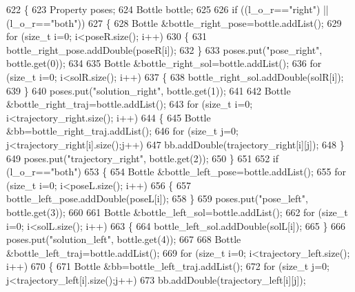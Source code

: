\begin{DoxyCode}
622 \{
623     Property poses;
624     Bottle bottle;
625 
626     \textcolor{keywordflow}{if} ((l\_o\_r==\textcolor{stringliteral}{"right"}) || (l\_o\_r==\textcolor{stringliteral}{"both"}))
627     \{
628         Bottle &bottle\_right\_pose=bottle.addList();
629         \textcolor{keywordflow}{for} (\textcolor{keywordtype}{size\_t} i=0; i<poseR.size(); i++)
630         \{
631             bottle\_right\_pose.addDouble(poseR[i]);
632         \}
633         poses.put(\textcolor{stringliteral}{"pose\_right"}, bottle.get(0));
634 
635         Bottle &bottle\_right\_sol=bottle.addList();
636         \textcolor{keywordflow}{for} (\textcolor{keywordtype}{size\_t} i=0; i<solR.size(); i++)
637         \{
638             bottle\_right\_sol.addDouble(solR[i]);
639         \}
640         poses.put(\textcolor{stringliteral}{"solution\_right"}, bottle.get(1));
641 
642         Bottle &bottle\_right\_traj=bottle.addList();
643         \textcolor{keywordflow}{for} (\textcolor{keywordtype}{size\_t} i=0; i<trajectory_right.size(); i++)
644         \{
645             Bottle &bb=bottle\_right\_traj.addList();
646             \textcolor{keywordflow}{for} (\textcolor{keywordtype}{size\_t} j=0; j<trajectory_right[i].size();j++)
647                 bb.addDouble(trajectory_right[i][j]);
648         \}
649         poses.put(\textcolor{stringliteral}{"trajectory\_right"}, bottle.get(2));
650     \}
651 
652     \textcolor{keywordflow}{if} (l\_o\_r==\textcolor{stringliteral}{"both"})
653     \{
654         Bottle &bottle\_left\_pose=bottle.addList();
655         \textcolor{keywordflow}{for} (\textcolor{keywordtype}{size\_t} i=0; i<poseL.size(); i++)
656         \{
657             bottle\_left\_pose.addDouble(poseL[i]);
658         \}
659         poses.put(\textcolor{stringliteral}{"pose\_left"}, bottle.get(3));
660 
661         Bottle &bottle\_left\_sol=bottle.addList();
662         \textcolor{keywordflow}{for} (\textcolor{keywordtype}{size\_t} i=0; i<solL.size(); i++)
663         \{
664             bottle\_left\_sol.addDouble(solL[i]);
665         \}
666         poses.put(\textcolor{stringliteral}{"solution\_left"}, bottle.get(4));
667 
668         Bottle &bottle\_left\_traj=bottle.addList();
669         \textcolor{keywordflow}{for} (\textcolor{keywordtype}{size\_t} i=0; i<trajectory_left.size(); i++)
670         \{
671             Bottle &bb=bottle\_left\_traj.addList();
672             \textcolor{keywordflow}{for} (\textcolor{keywordtype}{size\_t} j=0; j<trajectory_left[i].size();j++)
673                 bb.addDouble(trajectory_left[i][j]);

\end{DoxyCode}
